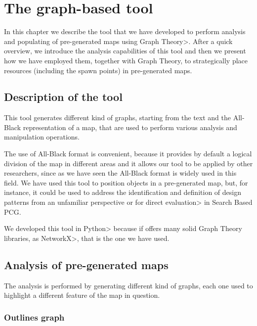\chapter{The graph-based tool}


In this chapter we describe the tool that we have developed to perform analysis and populating of pre-generated maps using \<Graph Theory>. After a quick overview, we introduce the analysis capabilities of this tool and then we present how we have employed them, together with Graph Theory, to strategically place resources (including the spawn points) in pre-generated maps.


\section{Description of the tool}

This tool generates different kind of graphs, starting from the text and the All-Black representation of a map, that are used to perform various analysis and manipulation operations.

\par

The use of All-Black format is convenient, because it provides by default a logical division of the map in different areas and it allows our tool to be applied by other researchers, since as we have seen the All-Black format is widely used in this field. We have used this tool to position objects in a pre-generated map, but, for instance, it could be used to address the identification and definition of design patterns from an unfamiliar perspective or for \<direct evaluation> in Search Based PCG.

\par 

We developed this tool in \<Python> because if offers many solid Graph Theory libraries, as \<NetworkX>, that is the one we have used.


\section{Analysis of pre-generated maps}

The analysis is performed by generating different kind of graphs, each one used to highlight a different feature of the map in question.

\subsection{Outlines graph}

